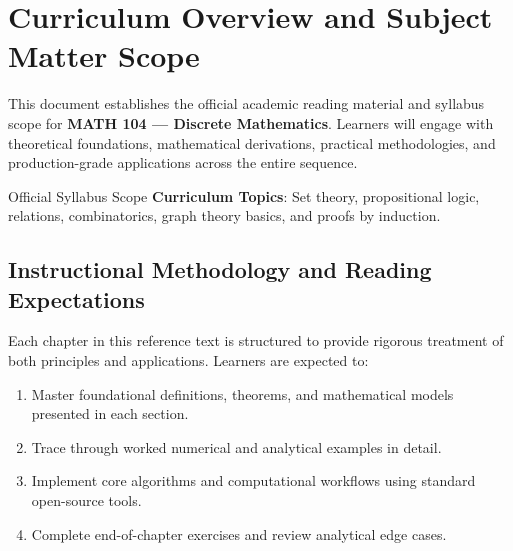 \section{Curriculum Overview and Subject Matter Scope}

This document establishes the official academic reading material and syllabus scope for \textbf{MATH 104 --- Discrete Mathematics}. Learners will engage with theoretical foundations, mathematical derivations, practical methodologies, and production-grade applications across the entire sequence.

\begin{InsightBox}{Official Syllabus Scope}
  \textbf{Curriculum Topics}: Set theory, propositional logic, relations, combinatorics, graph theory basics, and proofs by induction.
\end{InsightBox}

\subsection{Instructional Methodology and Reading Expectations}

Each chapter in this reference text is structured to provide rigorous treatment of both principles and applications. Learners are expected to:
\begin{enumerate}
  \item Master foundational definitions, theorems, and mathematical models presented in each section.
  \item Trace through worked numerical and analytical examples in detail.
  \item Implement core algorithms and computational workflows using standard open-source tools.
  \item Complete end-of-chapter exercises and review analytical edge cases.
\end{enumerate}

